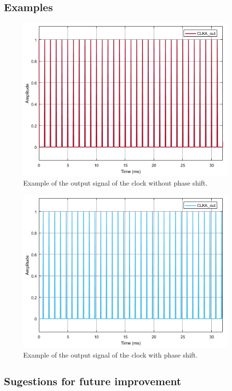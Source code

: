 \subsection*{Examples}

\begin{figure}[h]
	\centering
	\includegraphics[width=\textwidth]{./lib/clock_20171219/figures/clock_withoutpha}
	\caption{Example of the output signal of the clock without phase shift.}
\end{figure}

\begin{figure}[h]
	\centering
	\includegraphics[width=\textwidth]{./lib/clock_20171219/figures/clockPhased}
	\caption{Example of the output signal of the clock with phase shift.}
\end{figure}

\subsection*{Sugestions for future improvement}

